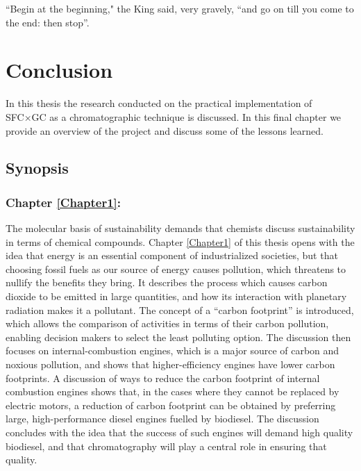 
\begin{savequote}[\quotewidth]
``Begin at the beginning," the King said, very gravely, ``and go on till you come to the end: then stop''.
\end{savequote}

\chapter{Conclusion} %


In this thesis the research conducted on the practical implementation of SFC×GC
as a chromatographic technique is discussed. In this final chapter we provide an
overview of the project and discuss some of the lessons learned.

\section{Synopsis}

\subsection{Chapter \ref{Chapter1}:  }

The molecular basis of sustainability \autocite{Anastas2016} demands that
chemists discuss sustainability in terms of chemical compounds. Chapter
\ref{Chapter1} of this thesis opens with the idea that energy is an essential
component of industrialized societies, but that choosing fossil fuels as our
source of energy causes pollution, which threatens to nullify the benefits they
bring. It describes the process which causes carbon dioxide to be emitted in
large quantities, and how its interaction with planetary radiation makes it a
pollutant. The concept of a ``carbon footprint'' is introduced, which allows the
comparison of activities in terms of their carbon pollution, enabling decision
makers to select the least polluting option. The discussion then focuses on
internal-combustion engines, which is a major source of carbon and noxious
pollution, and shows that higher-efficiency engines have lower carbon
footprints. A discussion of ways to reduce the carbon footprint of internal
combustion engines shows that, in the cases where they cannot be replaced by
electric motors, a reduction of carbon footprint can be obtained by preferring
large, high-performance diesel engines fuelled by biodiesel. The discussion
concludes with the idea that the success of such engines will demand high
quality biodiesel, and that chromatography will play a central role in ensuring
that quality.

